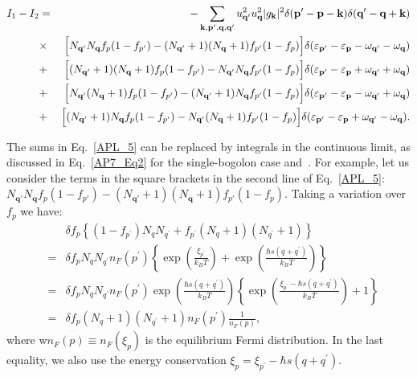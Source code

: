 \begin{footnotesize}
\begin{eqnarray}\label{APL_5}
I_1-I_2&=&-\sum_{\mathbf{k},\mathbf{p}',\mathbf{q},\mathbf{q}'}u^2_{\textbf{q}'}u^2_{\textbf{q}}|g_\textbf{k}|^2\delta(\textbf{p}'-\textbf{p}-\textbf{k})\delta(\textbf{q}'-\textbf{q}+\textbf{k})\\ \nonumber
&\times&  \Bigr[N_{\textbf{q}'}N_{\textbf{q}}f_p(1-f_{p'})-(N_{\textbf{q}'}+1)(N_{\textbf{q}}+1)f_{p'}(1-f_{p})\Bigl] \delta(\varepsilon_{\textbf{p}'}-\varepsilon_{\textbf{p}}-\omega_{\textbf{q}'}-\omega_{\textbf{q}})\\ \nonumber
&+&\Bigl[(N_{\textbf{q}'}+1)(N_{\textbf{q}}+1)f_p(1-f_{p'})-N_{\textbf{q}'}N_{\textbf{q}}f_{p'}(1-f_{p})\Bigr] \delta(\varepsilon_{\textbf{p}'}-\varepsilon_{\textbf{p}}+\omega_{\textbf{q}'}+\omega_{\textbf{q}})\\\nonumber
&+&\Bigr[N_{\textbf{q}'}(N_{\textbf{q}}+1)f_p(1-f_{p'})-(N_{\textbf{q}'}+1)N_{\textbf{q}}f_{p'}(1-f_{p})\Bigl] \delta(\varepsilon_{\textbf{p}'}-\varepsilon_{\textbf{p}}-\omega_{\textbf{q}'}+\omega_{\textbf{q}})\\\nonumber
&+&\Bigl[(N_{\textbf{q}'}+1)N_{\textbf{q}}f_p(1-f_{p'})-N_{\textbf{q}'}(N_{\textbf{q}}+1)f_{p'}(1-f_{p})\Bigr] \delta(\varepsilon_{\textbf{p}'}-\varepsilon_{\textbf{p}}+\omega_{\textbf{q}'}-\omega_{\textbf{q}}) .
\end{eqnarray}
\end{footnotesize}
%

The sums in Eq.~\eqref{APL_5} can be replaced by integrals in the continuous limit, as discussed in Eq.~\eqref{AP7_Eq2} for the single-bogolon case and~\cite{Zaitsev:2014aa}.
For example, let us consider the terms in the square brackets in the second line of Eq.~\eqref{APL_5}: $N_{\textbf{q}'}N_{\textbf{q}}f_p(1-f_{p'})-(N_{\textbf{q}'}+1)(N_{\textbf{q}}+1)f_{p'}(1-f_{p})$.
Taking a variation over $f_p$ we have:
%
\begin{eqnarray}
\label{EqBol}
&{}&{}\delta f_p\left\{(1-f_{p^\prime})N_qN_{q^\prime}+f_{p^\prime}(N_q+1)(N_{q^\prime}+1)\right\}\\ \nonumber
&=& \delta f_pN_qN_{q^\prime}n_F(p^\prime)\left\{\exp\left(\frac{\xi_{p^{\prime}}}{k_BT}\right)+\exp\left(\frac{\hbar s (q+q^\prime)}{k_BT}\right)\right\}\\ \nonumber
&=&\delta f_pN_qN_{q^\prime}n_F(p^\prime) \exp\left(\frac{\hbar s (q+q^\prime)}{k_BT}\right) \left\{\exp\left(\frac{\xi_{p^{\prime}}-\hbar s (q+q^\prime)}{k_BT}\right)+1\right\}\\ \nonumber
&=& \delta f_p(N_q+1)(N_{q^\prime}+1)n_F(p^\prime)\frac{1}{n_F(p)},
\end{eqnarray}
%
where w$n_F(p)\equiv n_F(\xi_p)$ is the equilibrium Fermi distribution. In the last equality, we also use the energy conservation $\xi_{p}=\xi_{p^{\prime}}-\hbar s (q+q^\prime)$.

